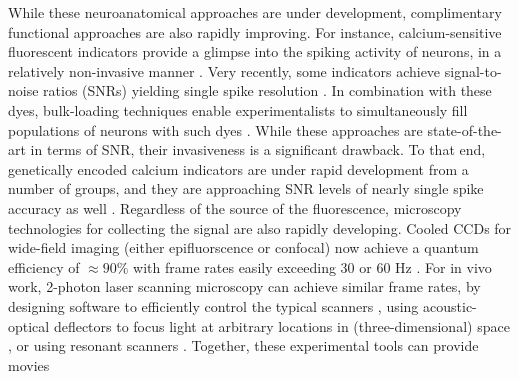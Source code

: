 While these neuroanatomical approaches are under development, complimentary functional approaches are also rapidly improving.  For instance, calcium-sensitive fluorescent indicators provide a glimpse into the spiking activity of neurons, in a relatively non-invasive manner \cite{Tsien89}. Very recently, some indicators achieve signal-to-noise ratios (SNRs) yielding single spike resolution \cite{??}.  In combination with these dyes, bulk-loading techniques enable experimentalists to simultaneously fill populations of neurons with such dyes \cite{??}.  While these approaches are state-of-the-art in terms of SNR, their invasiveness is a significant drawback.  To that end, genetically encoded calcium indicators are under rapid development from a number of groups, and they are approaching SNR levels of nearly single spike accuracy as well \cite{??}. Regardless of the source of the fluorescence, microscopy technologies for collecting the signal are also rapidly developing.  Cooled CCDs for wide-field imaging (either epifluorscence or confocal) now achieve a quantum efficiency of $\approx 90 \%$ with frame rates easily exceeding $30$ or $60$ Hz \cite{redshirt}.  For in vivo work, 2-photon laser scanning microscopy can achieve similar frame rates, by designing software to efficiently control the typical scanners \cite{??}, using acoustic-optical deflectors to focus light at arbitrary locations in (three-dimensional) space \cite{??}, or using resonant scanners \cite{??}.  Together, these experimental tools can provide movies 






